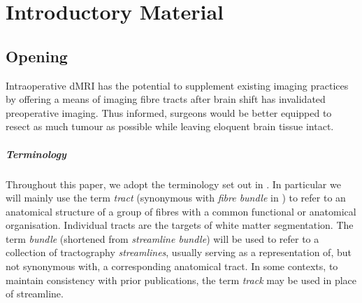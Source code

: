 \chapter{Introductory Material}
\label{chapterlabel0}

\section{Opening}


Intraoperative dMRI has the potential to supplement existing imaging practices by offering a means of imaging fibre tracts after brain shift has invalidated preoperative imaging.\autocite{Nimsky2001}
Thus informed, surgeons would be better equipped to resect as much tumour as possible while leaving eloquent brain tissue intact. 

\paragraph{Terminology}

Throughout this paper, we adopt the terminology set out in \textcite{Cote2013}.
In particular we will mainly use the term \textit{tract} (synonymous with \textit{fibre bundle} in \textcite{Cote2013}) to refer to an anatomical structure of a group of fibres with a common functional or anatomical organisation.
Individual tracts are the targets of white matter segmentation.
The term \textit{bundle} (shortened from \textit{streamline bundle}) will be used to refer to a collection of tractography \textit{streamlines}, usually serving as a representation of, but not synonymous with, a corresponding anatomical tract.
In some contexts, to maintain consistency with prior publications, the term \textit{track} may be used in place of streamline.
